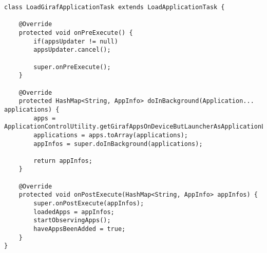   \begin{lstlisting}[caption={The LoadGirafApplicationTask, derived from LoadApplicationTask. This is the derived class used by GirafFragment to load applications into view. Please note that all comments and the constructor have been removed to make the listing smaller}, label={lst:derivedlat}]
class LoadGirafApplicationTask extends LoadApplicationTask {
	
	@Override
	protected void onPreExecute() {
		if(appsUpdater != null)
		appsUpdater.cancel();
		
		super.onPreExecute();
	}
	
	@Override
	protected HashMap<String, AppInfo> doInBackground(Application... applications) {
		apps = ApplicationControlUtility.getGirafAppsOnDeviceButLauncherAsApplicationList(context);
		applications = apps.toArray(applications);
		appInfos = super.doInBackground(applications);
		
		return appInfos;
	}
	
	@Override
	protected void onPostExecute(HashMap<String, AppInfo> appInfos) {
		super.onPostExecute(appInfos);
		loadedApps = appInfos;
		startObservingApps();
		haveAppsBeenAdded = true;
	}
}
\end{lstlisting}